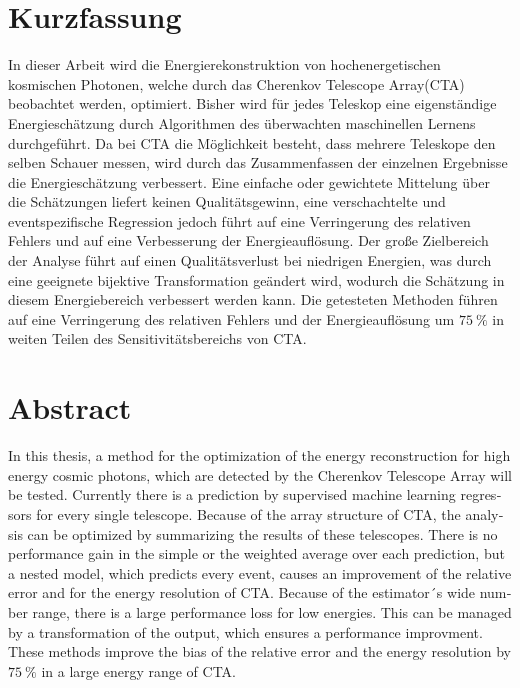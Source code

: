 \thispagestyle{plain}

\section*{Kurzfassung}
In dieser Arbeit wird die Energierekonstruktion von hochenergetischen kosmischen Photonen, welche durch das Cherenkov Telescope Array(CTA) beobachtet
werden, optimiert.
Bisher wird für jedes Teleskop eine eigenständige Energieschätzung durch Algorithmen des überwachten maschinellen Lernens durchgeführt.
Da bei CTA die Möglichkeit besteht, dass mehrere Teleskope den selben Schauer messen, wird durch das Zusammenfassen der einzelnen Ergebnisse die
Energieschätzung verbessert.
Eine einfache oder gewichtete Mittelung über die Schätzungen liefert keinen Qualitätsgewinn, eine verschachtelte und eventspezifische Regression jedoch
führt auf eine Verringerung des relativen Fehlers und auf eine Verbesserung der Energieauflösung.
Der große Zielbereich der Analyse führt auf einen Qualitätsverlust bei niedrigen Energien, was durch eine geeignete bijektive Transformation
geändert wird, wodurch die Schätzung in diesem Energiebereich verbessert werden kann.
Die getesteten Methoden führen auf eine Verringerung des relativen Fehlers und der Energieauflösung um $\SI{75}{\percent}$ in weiten Teilen des Sensitivitätsbereichs von CTA.

\section*{Abstract}
\begin{english}
In this thesis, a method for the optimization of the energy reconstruction for high energy cosmic photons, which are detected by the Cherenkov Telescope Array will be tested.
Currently there is a prediction by supervised machine learning regressors for every single telescope.
Because of the array structure of CTA, the analysis can be optimized by summarizing the results of these telescopes.
There is no performance gain in the simple or the weighted average over each prediction, but a nested model, which predicts every event, causes an improvement
of the relative error and for the energy resolution of CTA.
Because of the estimator´s wide number range, there is a large performance loss for low energies.
This can be managed by a transformation of the output, which ensures a performance improvment.
These methods improve the bias of the relative error and the energy resolution by $\SI{75}{\percent}$ in a large energy range of CTA.
\end{english}
